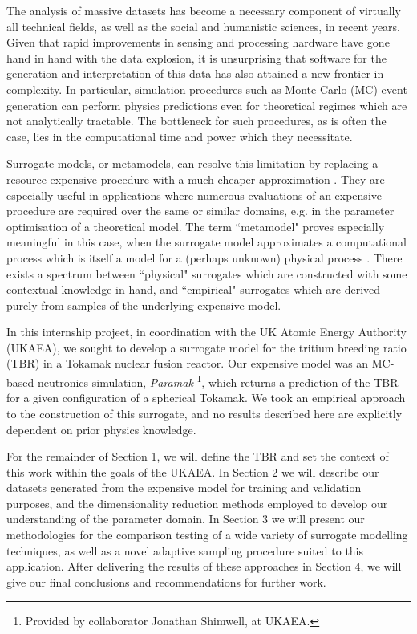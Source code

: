 The analysis of massive datasets has become a necessary component of virtually all technical fields, as well as the social and humanistic sciences, in recent years. Given that rapid improvements in sensing and processing hardware have gone hand in hand with the data explosion, it is unsurprising that software for the generation and interpretation of this data has also attained a new frontier in complexity. In particular, simulation procedures such as Monte Carlo (MC) event generation can perform physics predictions even for theoretical regimes which are not analytically tractable. The bottleneck for such procedures, as is often the case, lies in the computational time and power which they necessitate.

Surrogate models, or metamodels, can resolve this limitation by replacing a resource-expensive procedure with a much cheaper approximation \cite{Sondergaard2003}. They are especially useful in applications where numerous evaluations of an expensive procedure are required over the same or similar domains, e.g. in the parameter optimisation of a theoretical model. The term ``metamodel" proves especially meaningful in this case, when the surrogate model approximates a computational process which is itself a model for a (perhaps unknown) physical process \cite{Myers2002}. There exists a spectrum between ``physical" surrogates which are constructed with some contextual knowledge in hand, and ``empirical" surrogates which are derived purely from samples of the underlying expensive model. 

In this internship project, in coordination with the UK Atomic Energy Authority (UKAEA), we sought to develop a surrogate model for the tritium breeding ratio (TBR) in a Tokamak nuclear fusion reactor. Our expensive model was an MC-based neutronics simulation, \textit{Paramak} \footnote{Provided by collaborator Jonathan Shimwell, at UKAEA.}, which returns a prediction of the TBR for a given configuration of a spherical Tokamak. We took an empirical approach to the construction of this surrogate, and no results described here are explicitly dependent on prior physics knowledge.

For the remainder of Section 1, we will define the TBR and set the context of this work within the goals of the UKAEA. In Section 2 we will describe our datasets generated from the expensive model for training and validation purposes, and the dimensionality reduction methods employed to develop our understanding of the parameter domain. In Section 3 we will present our methodologies for the comparison testing of a wide variety of surrogate modelling techniques, as well as a novel adaptive sampling procedure suited to this application. After delivering the results of these approaches in Section 4, we will give our final conclusions and recommendations for further work.

